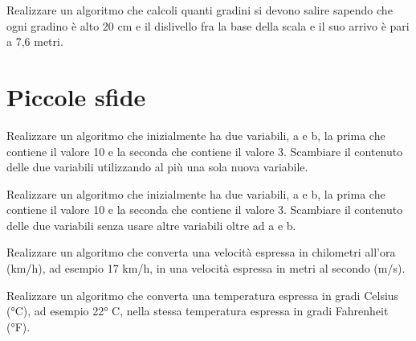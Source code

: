\begin{exercise}
	Realizzare un algoritmo che calcoli quanti gradini si devono salire sapendo che ogni gradino è alto 20 cm e il dislivello fra la base della scala e il suo arrivo è pari a 7,6 metri.
\end{exercise}

\section{Piccole sfide}

\begin{exercise}
	Realizzare un algoritmo che inizialmente ha due variabili, a e b, la prima che contiene il valore 10 e la seconda che contiene il valore 3. Scambiare il contenuto delle due variabili utilizzando al più una sola nuova variabile.
\end{exercise}

\begin{exercise}
	Realizzare un algoritmo che inizialmente ha due variabili, a e b, la prima che contiene il valore 10 e la seconda che contiene il valore 3. Scambiare il contenuto delle due variabili senza usare altre variabili oltre ad a e b.
\end{exercise}

\begin{exercise}
	Realizzare un algoritmo che converta una velocità espressa in chilometri all'ora (km/h), ad esempio 17 km/h, in una velocità espressa in metri al secondo (m/s).
\end{exercise}

\begin{exercise}
	Realizzare un algoritmo che converta una temperatura espressa in gradi Celsius (°C), ad esempio 22° C, nella stessa temperatura espressa in gradi Fahrenheit (°F).
\end{exercise}